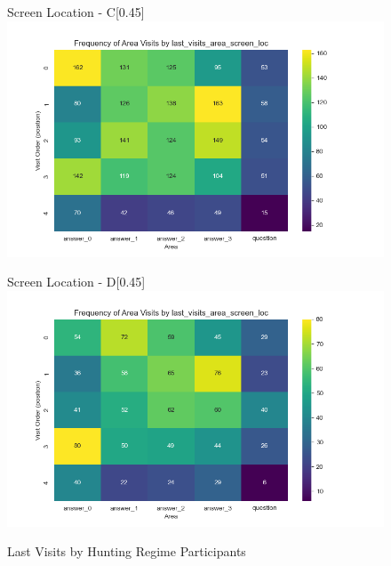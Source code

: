 \documentclass{article}
\begin{document}
\begin{figure}[H]
      \vspace{0.5em}
    
      \begin{subcaptionbox}{Screen Location - C\label{fig:ccc}}[0.45\textwidth]
        {\centering\includegraphics[width=\linewidth]{plots/visits/matrix__last_visits_area_screen_loc_hunters_C.png}}
      \end{subcaptionbox}
      \hfill
      \begin{subcaptionbox}{Screen Location - D\label{fig:ddd}}[0.45\textwidth]
        {\centering\includegraphics[width=\linewidth]{plots/visits/matrix__last_visits_area_screen_loc_hunters_D.png}}
      \end{subcaptionbox}
      
      \caption{Last Visits by Hunting Regime Participants}
      \label{fig:last_hunt_loc}
    \end{figure}
\end{document}
